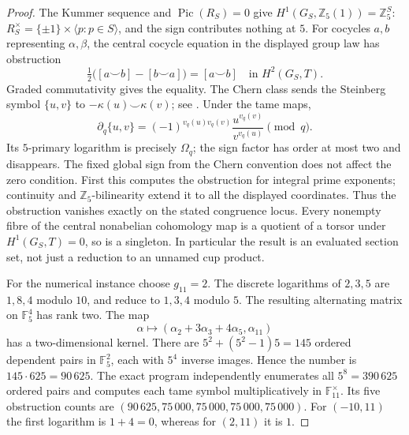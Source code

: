 \begin{proof}
The Kummer sequence and $\operatorname{Pic}(R_S)=0$
give $H^1(G_S,\mathbb Z_5(1))=\mathbb Z_5^S$:
$R_S^\times=\{\pm1\}\times\langle p:p\in S\rangle$,
and the sign contributes nothing at $5$.
For cocycles $a,b$ representing $\alpha,\beta$, the
central cocycle equation in the displayed group law
has obstruction
\[
 \tfrac12\bigl([a\smile b]-[b\smile a]\bigr)
                       =[a\smile b]\quad\text{in }H^2(G_S,T).
\]
Graded commutativity gives the equality. The Chern
class sends the Steinberg symbol $\{u,v\}$ to
$-\kappa(u)\smile\kappa(v)$; see
\citet[\S2.2.4.4 and Lemma~2.2.4.4]{FA_Soule1978}.
Under the tame maps,
\[
 \partial_q\{u,v\}
       =(-1)^{v_q(u)v_q(v)}
          \frac{u^{v_q(v)}}{v^{v_q(u)}}\pmod q.
\]
Its $5$-primary logarithm is precisely $\Omega_q$;
the sign factor has order at most two and disappears.
The fixed global sign from the Chern convention
does not affect the zero condition. First this
computes the obstruction for integral prime
exponents; continuity and $\mathbb Z_5$-bilinearity
extend it to all the displayed coordinates.
Thus the obstruction vanishes exactly on the stated
congruence locus. Every nonempty fibre of the
central nonabelian cohomology map is a quotient
of a torsor under $H^1(G_S,T)=0$, so is a singleton.
In particular the result is an evaluated section
set, not just a reduction to an unnamed cup product.

For the numerical instance choose $g_{11}=2$.
The discrete logarithms of $2,3,5$ are $1,8,4$
modulo $10$, and reduce to $1,3,4$ modulo $5$.
The resulting alternating matrix on $\mathbb F_5^4$
has rank two. The map
\[
 \alpha\longmapsto
   (\alpha_2+3\alpha_3+4\alpha_5,\alpha_{11})
\]
has a two-dimensional kernel. There are
$5^2+(5^2-1)5=145$ ordered dependent pairs in
$\mathbb F_5^2$, each with $5^4$ inverse images.
Hence the number is $145\cdot625=90\,625$.
The exact program independently enumerates all
$5^8=390\,625$ ordered pairs and computes each
tame symbol multiplicatively in $\mathbb F_{11}^\times$.
Its five obstruction counts are
$(90\,625,75\,000,75\,000,75\,000,75\,000)$.
For $(-10,11)$ the first logarithm is $1+4=0$,
whereas for $(2,11)$ it is $1$.


\end{proof}
